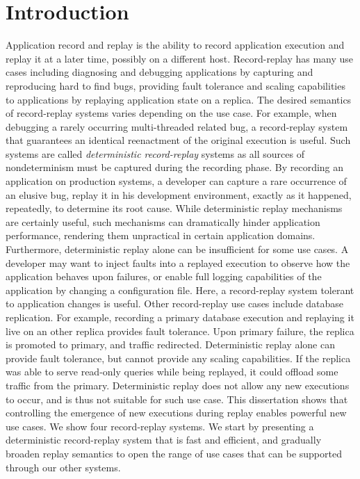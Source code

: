 \chapter{Introduction}
\label{ch:intro}

Application record and replay is the ability to record application execution and
replay it at a later time, possibly on a different host. Record-replay has many
use cases including diagnosing and debugging applications by capturing and
reproducing hard to find bugs, providing fault tolerance and scaling
capabilities to applications by replaying application state on a replica.
The desired semantics of record-replay systems varies depending on the use case.
For example, when debugging a rarely occurring multi-threaded related bug,
a record-replay system that guarantees an identical reenactment of the original
execution is useful. Such systems are called {\em deterministic record-replay}
systems as all sources of nondeterminism must be captured during the recording
phase.
By recording an application on production
systems, a developer can capture a rare occurrence of an elusive bug, replay it
in his development environment, exactly as it happened, repeatedly, to
determine its root cause.
While deterministic replay mechanisms are certainly useful, such mechanisms
can dramatically hinder application performance, rendering them
unpractical in certain application domains. Furthermore, deterministic replay alone
can be insufficient for some use cases. A developer may want to inject faults
into a replayed execution to observe how the application behaves upon failures, or
enable full logging capabilities of the application by changing a configuration
file. Here, a record-replay system tolerant to application changes is useful.
Other record-replay use cases include database replication. For example,
recording a primary database execution and replaying it live on an other
replica provides fault tolerance. Upon primary failure, the replica is
promoted to primary, and traffic redirected. Deterministic replay alone can
provide fault tolerance, but cannot provide any scaling capabilities.
If the replica was able to serve read-only queries while being replayed,
it could offload some traffic from the primary. Deterministic replay does
not allow any new executions to occur, and is thus not suitable for such use case.
This dissertation shows that controlling the emergence of new executions during
replay enables powerful new use cases.
We show four record-replay systems. We start by presenting a deterministic
record-replay system that is fast and efficient, and gradually broaden
replay semantics to open the range of use cases that can be supported through
our other systems.

